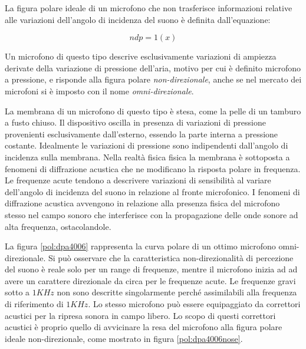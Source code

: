 La figura polare ideale di un microfono che non trasferisce informazioni relative
alle variazioni dell'angolo di incidenza del suono è definita dall'equazione:

\begin{equation}
ndp = 1(x)
\label{eq:omni}
\end{equation}

Un microfono di questo tipo descrive esclusivamente variazioni di ampiezza
derivate della variazione di pressione dell'aria, motivo per cui è definito
microfono a pressione, e risponde alla figura polare \emph{non-direzionale}, anche se
nel mercato dei microfoni si è imposto con il nome \emph{omni-direzionale}.

La membrana di un microfono di questo tipo è stesa, come la pelle di un tamburo a fusto chiuso.
Il dispositivo oscilla in presenza di variazioni di pressione provenienti esclusivamente dall’esterno,
essendo la parte interna a pressione costante. Idealmente le variazioni di pressione sono indipendenti
dall’angolo di incidenza sulla membrana. Nella realtà fisica fisica la membrana
è sottoposta a fenomeni di diffrazione acustica che ne modificano la risposta polare in frequenza.
Le frequenze acute tendono a descrivere variazioni di sensibilità al variare
dell’angolo di incidenza del suono in relazione al fronte microfonico.
I fenomeni di diffrazione acustica avvengono in relazione alla presenza fisica
del microfono stesso nel campo sonoro che interferisce con la propagazione delle
onde sonore ad alta frequenza, ostacolandole.

La figura \ref{pol:dpa4006} rappresenta la curva polare di un ottimo microfono
omni-direzionale. Si può osservare che la caratteristica non-direzionalità di
percezione del suono è reale solo per un range di frequenze, mentre il microfono
inizia ad ad avere un carattere direzionale da circa per le frequenze acute.
Le frequenze gravi sotto a $1KHz$ non sono descritte singolarmente perché
assimilabili alla frequenza di riferimento di $1KHz$. Lo stesso microfono può essere
equipaggiato da correttori acustici per la ripresa sonora in campo libero. Lo
scopo di questi correttori acustici è proprio quello di avvicinare la resa del
microfono alla figura polare ideale non-direzionale, come mostrato in figura \ref{pol:dpa4006nose}.


